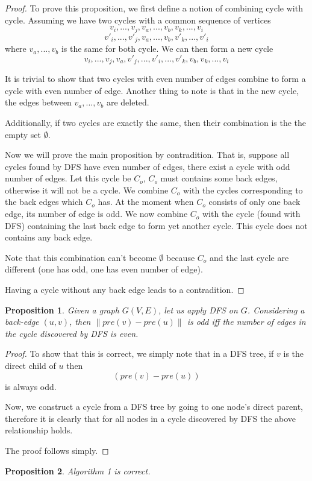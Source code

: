 \documentclass[a4paper,10pt,twoside]{article}
\newtheorem{proof}{Proof}
\newtheorem{proposition}{Proposition}
\begin{document}
\begin{proof}
	To prove this proposition, we first define a notion of combining cycle with cycle.
	Assuming we have two cycles with a common sequence of vertices
	\[
		v_i,...,v_j,v_a,...,v_b,v_k,...,v_i
	\]
	\[
		v'_i,...,v'_j,v_a,...,v_b,v'_k,...,v'_i	
	\]
	where $v_a, ..., v_b$ is the same for both cycle. We can then form a new cycle
	\[
		v_i,...,v_j,v_a,v'_j,...,v'_i,...,v'_k,v_b,v_k,...,v_i	
	\]

	It is trivial to show that two cycles with even number of edges combine to form a cycle
	with even number of edge. Another thing to note is that in the new cycle, the edges
	between $v_a,...,v_b$ are deleted.

	Additionally, if two cycles are exactly the same, then their combination is the the empty set $\emptyset$.

	Now we will prove the main proposition by contradition. That is, suppose all cycles found
	by DFS have even number of edges, there exist a cycle with odd number of edges. Let this cycle
	be $C_o$, $C_o$ must contains some back edges, otherwise it will not be a cycle. We combine
	$C_o$ with the cycles corresponding to the back edges which $C_o$ has. At the moment when 
	$C_o$ consists of only one back edge, its number of edge is odd. We now combine $C_o$ with
	the cycle (found with DFS) containing the last back edge to form yet another cycle. This cycle
	does not contains any back edge.

	Note that this combination can't become $\emptyset$ because $C_o$ and 
	the last cycle are different (one has odd, one has even number of edge).

	Having a cycle without any back edge leads to a contradition.

\end{proof}
\begin{proposition}
	Given a graph $G(V, E)$, let us apply DFS on $G$. Considering a back-edge $(u, v)$, then
	$\|pre(v) - pre(u)\|$ is odd iff the number of edges in the cycle discovered by DFS is even. 
\end{proposition}
\begin{proof}
	To show that this is correct, we simply note that in a DFS tree, if $v$ is the direct child
	of $u$ then $$(pre(v) - pre(u))$$ is always odd.

	Now, we construct a cycle from a DFS tree by going to one node's direct parent, therefore
	it is clearly that for all nodes in a cycle discovered by DFS the above relationship holds.

	The proof follows simply.
\end{proof}
\begin{proposition}
	Algorithm 1 is correct.
\end{proposition}
\end{document}
